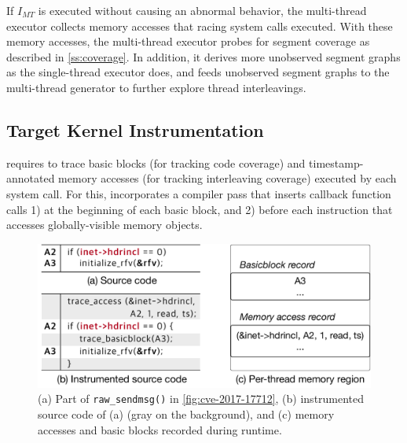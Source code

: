 If $I_{MT}$ is executed without causing an abnormal behavior, the
multi-thread executor collects memory accesses that racing system
calls executed.
%
With these memory accesses, the multi-thread executor probes for
segment coverage as described in \autoref{ss:coverage}. In addition,
it derives more unobserved segment graphs as the single-thread
executor does, and feeds unobserved segment graphs to the multi-thread
generator to further explore thread interleavings.







\subsection{Target Kernel Instrumentation}
\label{ss:instrumentation}

\sys requires to trace basic blocks (for tracking code coverage) and
timestamp-annotated memory accesses (for tracking interleaving
coverage) executed by each system call.
%
For this, \sys incorporates a compiler pass that inserts callback
function calls 1) at the beginning of each basic block, and 2) before
each instruction that accesses globally-visible memory objects.
%



\begin{figure}
  \centering
  \includegraphics[width=0.9\linewidth]{fig/instrumentation.pdf}
  \caption{(a) Part of \texttt{raw_sendmsg()} in
    \autoref{fig:cve-2017-17712}, (b) instrumented source code of (a)
    (gray on the background), and (c) memory accesses and basic blocks
    recorded during runtime.}
  \label{fig:instrumentation}
\end{figure}


